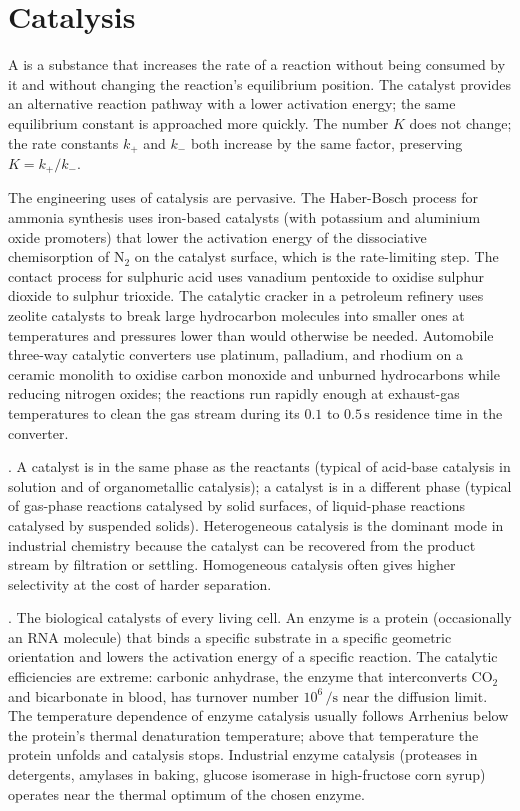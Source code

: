 \section{Catalysis}

A  is a substance that increases the rate of a
reaction without being consumed by it and without changing the
reaction's equilibrium position. The catalyst provides an alternative
reaction pathway with a lower activation energy; the same equilibrium
constant is approached more quickly. The number $K$ does not change;
the rate constants $k_+$ and $k_-$ both increase by the same factor,
preserving $K = k_+/k_-$.

The engineering uses of catalysis are pervasive. The Haber-Bosch
process for ammonia synthesis uses iron-based catalysts (with
potassium and aluminium oxide promoters) that lower the activation
energy of the dissociative chemisorption of N$_2$ on the catalyst
surface, which is the rate-limiting step. The contact process for
sulphuric acid uses vanadium pentoxide to oxidise sulphur dioxide
to sulphur trioxide. The catalytic cracker in a petroleum refinery
uses zeolite catalysts to break large hydrocarbon molecules into
smaller ones at temperatures and pressures lower than would otherwise
be needed. Automobile three-way catalytic converters use platinum,
palladium, and rhodium on a ceramic monolith to oxidise carbon
monoxide and unburned hydrocarbons while reducing nitrogen oxides;
the reactions run rapidly enough at exhaust-gas temperatures to clean
the gas stream during its $0.1$ to $0.5\,\si{\second}$ residence time
in the converter.

. A 
catalyst is in the same phase as the reactants (typical of acid-base
catalysis in solution and of organometallic catalysis); a
 catalyst is in a different phase (typical of
gas-phase reactions catalysed by solid surfaces, of liquid-phase
reactions catalysed by suspended solids). Heterogeneous catalysis is
the dominant mode in industrial chemistry because the catalyst can be
recovered from the product stream by filtration or settling.
Homogeneous catalysis often gives higher selectivity at the cost of
harder separation.

. The biological catalysts of every living cell. An
enzyme is a protein (occasionally an RNA molecule) that binds a
specific substrate in a specific geometric orientation and lowers the
activation energy of a specific reaction. The catalytic efficiencies
are extreme: carbonic anhydrase, the enzyme that interconverts CO$_2$
and bicarbonate in blood, has turnover number $10^6\,\si{\per\second}$
near the diffusion limit. The temperature dependence of enzyme
catalysis usually follows Arrhenius below the protein's thermal
denaturation temperature; above that temperature the protein unfolds
and catalysis stops. Industrial enzyme catalysis (proteases in
detergents, amylases in baking, glucose isomerase in high-fructose
corn syrup) operates near the thermal optimum of the chosen enzyme.

